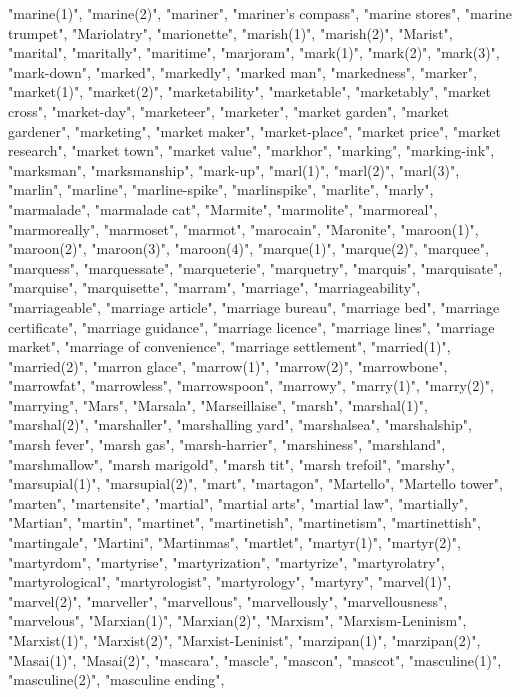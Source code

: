 "marine(1)",
"marine(2)",
"mariner",
"mariner's compass",
"marine stores",
"marine trumpet",
"Mariolatry",
"marionette",
"marish(1)",
"marish(2)",
"Marist",
"marital",
"maritally",
"maritime",
"marjoram",
"mark(1)",
"mark(2)",
"mark(3)",
"mark-down",
"marked",
"markedly",
"marked man",
"markedness",
"marker",
"market(1)",
"market(2)",
"marketability",
"marketable",
"marketably",
"market cross",
"market-day",
"marketeer",
"marketer",
"market garden",
"market gardener",
"marketing",
"market maker",
"market-place",
"market price",
"market research",
"market town",
"market value",
"markhor",
"marking",
"marking-ink",
"marksman",
"marksmanship",
"mark-up",
"marl(1)",
"marl(2)",
"marl(3)",
"marlin",
"marline",
"marline-spike",
"marlinspike",
"marlite",
"marly",
"marmalade",
"marmalade cat",
"Marmite",
"marmolite",
"marmoreal",
"marmoreally",
"marmoset",
"marmot",
"marocain",
"Maronite",
"maroon(1)",
"maroon(2)",
"maroon(3)",
"maroon(4)",
"marque(1)",
"marque(2)",
"marquee",
"marquess",
"marquessate",
"marqueterie",
"marquetry",
"marquis",
"marquisate",
"marquise",
"marquisette",
"marram",
"marriage",
"marriageability",
"marriageable",
"marriage article",
"marriage bureau",
"marriage bed",
"marriage certificate",
"marriage guidance",
"marriage licence",
"marriage lines",
"marriage market",
"marriage of convenience",
"marriage settlement",
"married(1)",
"married(2)",
"marron glace",
"marrow(1)",
"marrow(2)",
"marrowbone",
"marrowfat",
"marrowless",
"marrowspoon",
"marrowy",
"marry(1)",
"marry(2)",
"marrying",
"Mars",
"Marsala",
"Marseillaise",
"marsh",
"marshal(1)",
"marshal(2)",
"marshaller",
"marshalling yard",
"marshalsea",
"marshalship",
"marsh fever",
"marsh gas",
"marsh-harrier",
"marshiness",
"marshland",
"marshmallow",
"marsh marigold",
"marsh tit",
"marsh trefoil",
"marshy",
"marsupial(1)",
"marsupial(2)",
"mart",
"martagon",
"Martello",
"Martello tower",
"marten",
"martensite",
"martial",
"martial arts",
"martial law",
"martially",
"Martian",
"martin",
"martinet",
"martinetish",
"martinetism",
"martinettish",
"martingale",
"Martini",
"Martinmas",
"martlet",
"martyr(1)",
"martyr(2)",
"martyrdom",
"martyrise",
"martyrization",
"martyrize",
"martyrolatry",
"martyrological",
"martyrologist",
"martyrology",
"martyry",
"marvel(1)",
"marvel(2)",
"marveller",
"marvellous",
"marvellously",
"marvellousness",
"marvelous",
"Marxian(1)",
"Marxian(2)",
"Marxism",
"Marxism-Leninism",
"Marxist(1)",
"Marxist(2)",
"Marxist-Leninist",
"marzipan(1)",
"marzipan(2)",
"Masai(1)",
"Masai(2)",
"mascara",
"mascle",
"mascon",
"mascot",
"masculine(1)",
"masculine(2)",
"masculine ending",
